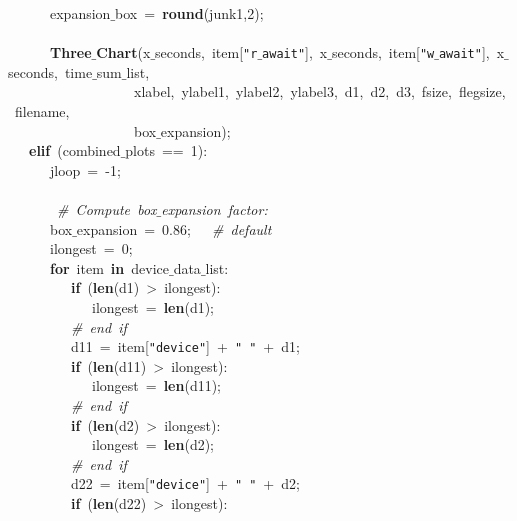 \mbox{}\ \ \ \ \ \ expansion$\_$box\ =\ \textbf{round}(junk1,2); \\
\mbox{}\ \ \ \ \ \  \\
\mbox{}\ \ \ \ \ \ \textbf{Three$\_$Chart}(x$\_$seconds,\ item[\texttt{"{}r$\_$await"{}}],\ x$\_$seconds,\ item[\texttt{"{}w$\_$await"{}}],\ x$\_$seconds,\ time$\_$sum$\_$list, \\
\mbox{}\ \ \ \ \ \ \ \ \ \ \ \ \ \ \ \ \ \ xlabel,\ ylabel1,\ ylabel2,\ ylabel3,\ d1,\ d2,\ d3,\ fsize,\ flegsize,\ filename, \\
\mbox{}\ \ \ \ \ \ \ \ \ \ \ \ \ \ \ \ \ \ box$\_$expansion); \\
\mbox{}\ \ \ \textbf{elif}\ (combined$\_$plots\ ==\ 1): \\
\mbox{}\ \ \ \ \ \ jloop\ =\ -1; \\
\mbox{}\ \ \ \ \ \  \\
\mbox{}\ \ \ \ \ \ \ \textit{\#\ Compute\ box$\_$expansion\ factor:} \\
\mbox{}\ \ \ \ \ \ box$\_$expansion\ =\ 0.86;\ \ \ \textit{\#\ default} \\
\mbox{}\ \ \ \ \ \ ilongest\ =\ 0; \\
\mbox{}\ \ \ \ \ \ \textbf{for}\ item\ \textbf{in}\ device$\_$data$\_$list: \\
\mbox{}\ \ \ \ \ \ \ \ \ \textbf{if}\ (\textbf{len}(d1)\ \textgreater{}\ ilongest): \\
\mbox{}\ \ \ \ \ \ \ \ \ \ \ \ ilongest\ =\ \textbf{len}(d1); \\
\mbox{}\ \ \ \ \ \ \ \ \ \textit{\#\ end\ if} \\
\mbox{}\ \ \ \ \ \ \ \ \ d11\ =\ item[\texttt{"{}device"{}}]\ +\ \texttt{"{}\ "{}}\ +\ d1; \\
\mbox{}\ \ \ \ \ \ \ \ \ \textbf{if}\ (\textbf{len}(d11)\ \textgreater{}\ ilongest): \\
\mbox{}\ \ \ \ \ \ \ \ \ \ \ \ ilongest\ =\ \textbf{len}(d11); \\
\mbox{}\ \ \ \ \ \ \ \ \ \textit{\#\ end\ if} \\
\mbox{}\ \ \ \ \ \ \ \ \ \textbf{if}\ (\textbf{len}(d2)\ \textgreater{}\ ilongest): \\
\mbox{}\ \ \ \ \ \ \ \ \ \ \ \ ilongest\ =\ \textbf{len}(d2); \\
\mbox{}\ \ \ \ \ \ \ \ \ \textit{\#\ end\ if} \\
\mbox{}\ \ \ \ \ \ \ \ \ d22\ =\ item[\texttt{"{}device"{}}]\ +\ \texttt{"{}\ "{}}\ +\ d2; \\
\mbox{}\ \ \ \ \ \ \ \ \ \textbf{if}\ (\textbf{len}(d22)\ \textgreater{}\ ilongest): \\

